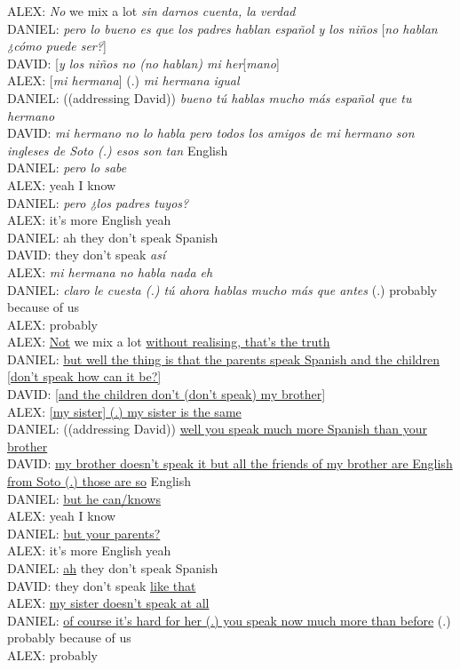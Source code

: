 \documentclass[output=paper]{langscibook}
\begin{document}
\begin{exe}\ex\label{RG:ex9}
ALEX:  \textit{No} we mix a lot \textit{sin darnos cuenta, la verdad}\\
DANIEL: \textit{pero lo bueno es que los padres hablan español y los niños} [\textit{no hablan ¿cómo puede ser?}]\\
DAVID: [\textit{y los niños no (no hablan) mi her}[\textit{mano}]\\
ALEX: [\textit{mi hermana}] (.) \textit{mi hermana igual}\\
DANIEL: ((addressing David)) \textit{bueno tú hablas mucho más español que tu hermano}\\
DAVID: \textit{mi hermano no lo habla pero todos los amigos de mi hermano son ingleses de Soto (.) esos son tan} English \\
DANIEL: \textit{pero lo sabe}\\
ALEX: yeah I know\\
DANIEL: \textit{pero ¿los padres tuyos?}\\
ALEX: it’s more English yeah\\
DANIEL: ah they don’t speak Spanish\\
DAVID: they don’t speak \textit{así}\\
ALEX: \textit{mi hermana no habla nada eh}\\
DANIEL: \textit{claro le cuesta (.) tú ahora hablas mucho más que antes} (.) probably because of us\\
ALEX: probably\\

ALEX: \ul{Not} we mix a lot \ul{without realising, that’s the truth}\\
DANIEL: \ul{but well the thing is that the parents speak Spanish and the children [don’t speak how can it be?]}\\
DAVID: \ul{[and the children don’t (don’t speak) my brother]}\\
ALEX: \ul{[my sister] (.) my sister is the same}\\
DANIEL: ((addressing David)) \ul{well you speak much more Spanish than your brother}\\
DAVID: \ul{my brother doesn’t speak it but all the friends of my brother are English from Soto (.) those are so} English\\
DANIEL: \ul{but he can/knows}\\
ALEX: yeah I know\\
DANIEL: \ul{but your parents?}\\
ALEX: it’s more English yeah\\
DANIEL: \ul{ah} they don’t speak Spanish\\
DAVID: they don’t speak \ul{like that}\\
ALEX: \ul{my sister doesn’t speak at all}\\
DANIEL: \ul{of course it’s hard for her (.) you speak now much more than before} (.) probably because of us\\
ALEX: probably
\end{exe}
\end{document}
